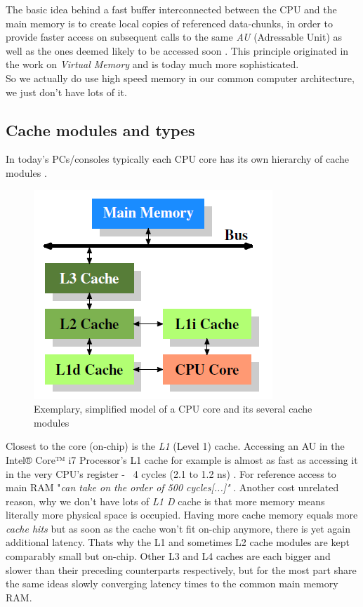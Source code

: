 The basic idea behind a fast buffer interconnected between the CPU and the main memory is to create local copies of referenced data-chunks, in order to provide faster access on subsequent calls to the same \textit{AU} (Adressable Unit) as well as the ones deemed likely to be accessed soon . This principle originated in the work on \textit{Virtual Memory}  and is today much more sophisticated.\\
So we actually do use high speed memory in our common computer architecture, we just don't have lots of it.

\subsection{Cache modules and types}
In today's PCs/consoles typically each CPU core has its own hierarchy of cache modules .
\begin{figure}[!htbp]
	\centering
	\includegraphics[width=0.4\linewidth]{PICs/cachelayout}
	\caption{Exemplary, simplified model of a CPU core and its several cache modules }\label{cache_layout}
\end{figure}
Closest to the core (on-chip) is the \textit{L1} (Level 1) cache. Accessing an AU in the  Intel® Core™ i7 Processor's L1 cache for example is almost as fast as accessing it in the very CPU's register - ~4 cycles (2.1 to 1.2 ns) . For reference access to main RAM "\textit{can take on the order of 500 cycles[...]"} .
Another cost unrelated reason, why we don't have lots of \textit{L1 D} cache is that more memory means literally more physical space is occupied. Having more cache memory equals more \textit{cache hits}  but as soon as the cache won't fit on-chip anymore, there is yet again additional latency. Thats why the L1 and sometimes L2 cache modules are kept comparably small but on-chip. Other L3 and L4 caches are each bigger and slower than their preceding counterparts respectively, but for the most part share the same ideas slowly converging latency times to the common main memory RAM.\\
